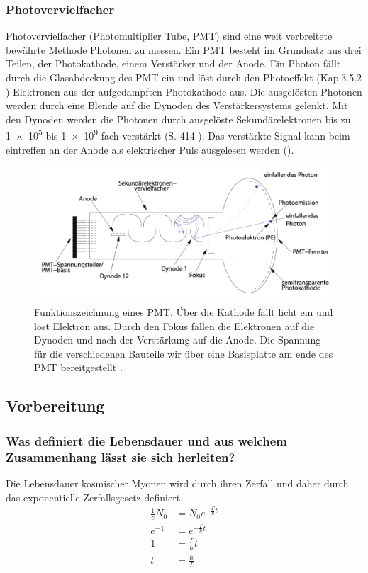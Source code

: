 \subsubsection{Photovervielfacher}
\label{sec:pmt}
Photovervielfacher (Photomultiplier Tube, PMT) sind eine weit verbreitete bewährte Methode Photonen zu messen.
Ein PMT besteht im Grundsatz aus drei Teilen, der Photokathode, einem Verstärker und der Anode.
Ein Photon fällt durch die Glasabdeckung des PMT ein und löst durch den Photoeffekt (Kap.3.5.2 \cite{source2}) Elektronen aus der aufgedampften Photokathode aus.
Die ausgelösten Photonen werden durch eine Blende auf die Dynoden des Verstärkersystems gelenkt.
Mit den Dynoden werden die Photonen durch ausgelöste Sekundärelektronen bis zu \num{1e5} bis \num{1e9} fach verstärkt (S. \num{414} \cite{source2}).
Das verstärkte Signal kann beim eintreffen an der Anode als elektrischer Puls ausgelesen werden (\cite{source2}).
\begin{figure}[ht]
    \centering
    \includegraphics[width = \textwidth]{./bilder/PMT.png}
    \caption{Funktionszeichnung eines PMT. Über die Kathode fällt licht ein und löst Elektron aus. Durch den Fokus fallen die Elektronen auf die Dynoden und nach der Verstärkung auf die Anode. Die Spannung für die verschiedenen Bauteile wir über eine Basisplatte am ende des PMT bereitgestellt \cite{Schmidt2002Aufbau}.}
    \label{fig:pmt}
\end{figure}

\subsection{Vorbereitung}
\subsubsection{Was definiert die Lebensdauer und aus welchem Zusammenhang lässt sie sich herleiten?}
Die Lebensdauer kosmischer Myonen wird durch ihren Zerfall und daher durch das exponentielle Zerfallsgesetz definiert.
\begin{align*}
    \frac{1}{e} N_0 &= N_0 e^{-\frac{\Gamma}{\hbar} t}\\
    e^{-1} &= e^{-\frac{\Gamma}{\hbar} t}\\
    1 &= \frac{\Gamma}{\hbar} t \\
    t &= \frac{\hbar}{\Gamma}
\end{align*}
